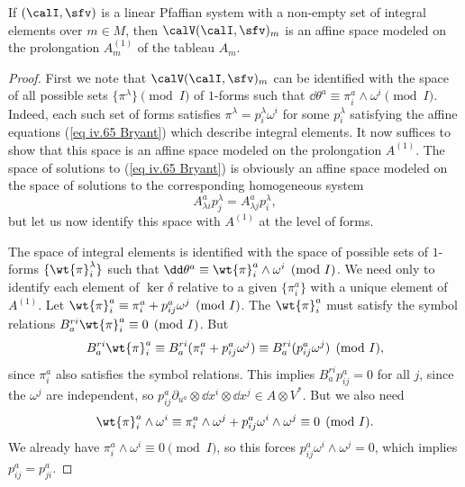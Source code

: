 \begin{prop}\label{prop 6.7.1 Ivey}\label{prop iv.5.7 Bryant}
    If $(\calI,\sfv)$ is a linear Pfaffian system with a non-empty set of integral elements over $m\in M$, then $\calV(\calI,\sfv)_m$ is an affine space modeled on the prolongation $A_m^{(1)}$ of the tableau $A_m$.
\end{prop}
\begin{proof}
    First we note that $\calV(\calI,\sfv)_m$ can be identified with the space of all possible sets $\{\pi^\lambda\}\pmod{I}$ of $1$-forms such that $\dd\theta^a\equiv \pi^a_i\wedge\omega^i\pmod{I}$. Indeed, each such set of forms satisfies $\pi^\lambda=p^\lambda_i\omega^i$ for some $p^\lambda_i$ satisfying the affine equations (\ref{eq iv.65 Bryant}) which describe integral elements. It now suffices to show that this space is an affine space modeled on the prolongation $A^{(1)}$. The space of solutions to (\ref{eq iv.65 Bryant}) is obviously an affine space modeled on the space of solutions to the corresponding homogeneous system 
    \[A^a_{\lambda i}p^\lambda_j=A^a_{\lambda j}p^\lambda_i,\]
    but let us now identify this space with $A^{(1)}$ at the level of forms.
    
    The space of integral elements is identified with the space of possible sets of $1$-forms $\{\wt{\pi}_i^\lambda\}$ such that $\dd\theta^a\equiv\wt{\pi}^a_i\wedge \omega^i\pmod{I}$. We need only to identify each element of $\ker\delta$ relative to a given $\{\pi^a_i\}$ with a unique element of $A^{(1)}$. Let $\wt{\pi}^a_i\equiv\pi^a_i+p^a_{ij}\omega^j \pmod{I}$. The $\wt{\pi}^a_i$ must satisfy the symbol relations $B^{ri}_a\wt{\pi}^a_i\equiv 0\pmod{I}$. But 
    \[B^{ri}_a \wt{\pi}^a_i\equiv B^{ri}_a(\pi^a_i+p^a_{ij}\omega^j)\equiv B^{ri}_a(p^a_{ij}\omega^j)\pmod{I},\]
    since $\pi^a_i$ also satisfies the symbol relations. This implies $B^{ri}_ap^a_{ij}=0$ for all $j$, since the $\omega^j$ are independent, so $p^a_{ij}\partial_{u^a}\otimes \dd x^i\otimes \dd x^j\in A\otimes V^\ast$. But we also need 
    \[\wt{\pi}^a_i\wedge \omega^i\equiv \pi^a_i\wedge\omega^j+p^a_{ij}\omega^i\wedge\omega^j\equiv 0\pmod{I}.\] 
    We already have $\pi^a_i\wedge \omega^i\equiv 0\pmod{I}$, so this forces $p^a_{ij}\omega^i\wedge \omega^j=0$, which implies $p^a_{ij}=p^a_{ji}$.
\end{proof}


